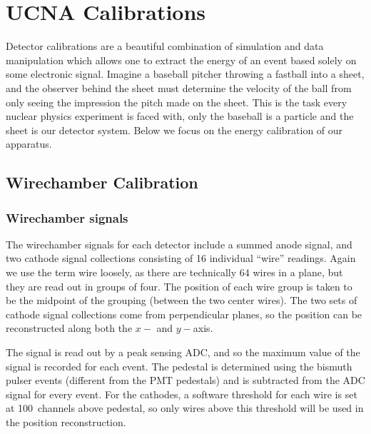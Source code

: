 \chapter{UCNA Calibrations}
\label{ch:UCNA_Calibrations}

Detector calibrations are a beautiful combination
of simulation and data manipulation which allows one to extract the energy of
an event based solely on some electronic signal. Imagine a baseball pitcher
throwing a fastball into a sheet, and the observer behind the sheet must
determine the velocity of the ball from only seeing the impression the pitch
made on the sheet. This is the task every nuclear physics experiment is faced
with, only the baseball is a particle and the sheet is our detector system.
Below we focus on the energy calibration of our apparatus.




\section{Wirechamber Calibration}

\subsection{Wirechamber signals}

The wirechamber signals for each detector include a summed anode signal, and two cathode signal
collections consisting of 16 individual ``wire'' readings. Again we use the term
wire loosely, as there are technically 64 wires in a plane, but they are read out in groups
of four. The position of each wire group is taken to be the midpoint of the grouping (between
the two center wires). The two sets of cathode signal collections come from perpendicular
planes, so the position can be reconstructed along both the $x-$ and $y-$axis.

The signal is read out by a peak sensing ADC, and so the maximum value of the signal is recorded
for each event. The pedestal is determined using the bismuth pulser events (different from the
PMT pedestals) and is subtracted from the ADC signal for every event. For the cathodes, a software
threshold for each wire is set at 100~channels above pedestal, so only wires above this threshold
will be used in the position reconstruction.

